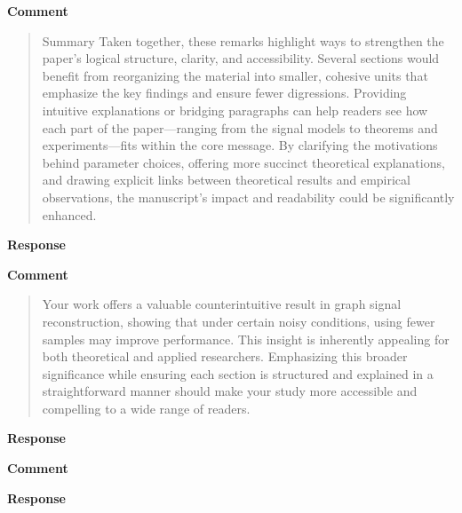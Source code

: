\documentclass[11pt,onecolumn,journal]{IEEEtran}
\begin{document}
\textbf{Comment}
\begin{quote}
Summary
Taken together, these remarks highlight ways to strengthen the paper’s logical structure, clarity, and accessibility. Several sections would benefit from reorganizing the material into smaller, cohesive units that emphasize the key findings and ensure fewer digressions. Providing intuitive explanations or bridging paragraphs can help readers see how each part of the paper—ranging from the signal models to theorems and experiments—fits within the core message. By clarifying the motivations behind parameter choices, offering more succinct theoretical explanations, and drawing explicit links between theoretical results and empirical observations, the manuscript’s impact and readability could be significantly enhanced.

\end{quote}
\textbf{Response}


\textbf{Comment}
\begin{quote}
Your work offers a valuable counterintuitive result in graph signal reconstruction, showing that under certain noisy conditions, using fewer samples may improve performance. This insight is inherently appealing for both theoretical and applied researchers. Emphasizing this broader significance while ensuring each section is structured and explained in a straightforward manner should make your study more accessible and compelling to a wide range of readers.
\end{quote}

\textbf{Response}


\textbf{Comment}
\begin{quote}

\end{quote}

\textbf{Response}
\end{document}
